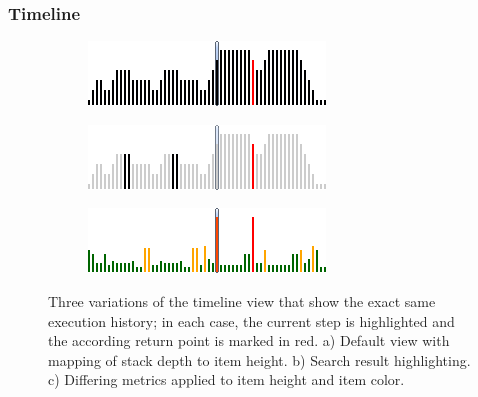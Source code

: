 \subsubsection{Timeline}

\begin{figure}[tb]
	\centering
	
	\begin{subfigure}[b]{0.45\textwidth}
		\centering
        \includegraphics[width=\textwidth]{../images/04-ImplTimeline1}
        \caption[Default View]{}
		\label{fig:ImplementationTimelineDefault}
	\end{subfigure}
	\quad
	\begin{subfigure}[b]{0.45\textwidth}
		\centering
		\includegraphics[width=\textwidth]{../images/04-ImplTimeline2}
		\caption[Search Result Highlighting]{}
		\label{fig:ImplementationTimelineSearch}
	\end{subfigure}
	\quad
	\begin{subfigure}[b]{0.45\textwidth}
		\centering
		\includegraphics[width=\textwidth]{../images/04-ImplTimeline3}
		\caption[Differing Metrics Applied to Item Height and Color]{}
		\label{fig:ImplementationTimelineMetrics}
	\end{subfigure}
	
	\caption[Variations of the Timeline View]{Three variations of the timeline view that show the exact same execution history; in each case, the current step is highlighted and the according return point is marked in red.
		a) Default view with mapping of stack depth to item height.
		b) Search result highlighting.
		c) Differing metrics applied to item height and item color.
	}
	\label{fig:ImplementationTimeline}
\end{figure}

